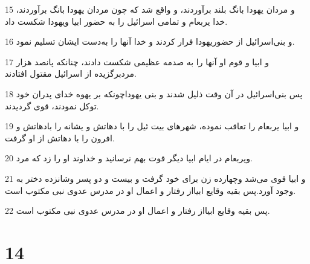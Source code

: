 \par 15 و مردان یهودا بانگ بلند برآوردند، و واقع شد که چون مردان یهودا بانگ برآوردند، خدا یربعام و تمامی اسرائیل را به حضور ابیا ویهودا شکست داد.
\par 16 و بنی‌اسرائیل از حضوریهودا فرار کردند و خدا آنها را به‌دست ایشان تسلیم نمود.
\par 17 و ابیا و قوم او آنها را به صدمه عظیمی شکست دادند، چنانکه پانصد هزار مردبرگزیده از اسرائیل مقتول افتادند.
\par 18 پس بنی‌اسرائیل در آن وقت ذلیل شدند و بنی یهوداچونکه بر یهوه خدای پدران خود توکل نمودند، قوی گردیدند.
\par 19 و ابیا یربعام را تعاقب نموده، شهرهای بیت ئیل را با دهاتش و یشانه را بادهاتش و افرون را با دهاتش از او گرفت.
\par 20 ویربعام در ایام ابیا دیگر قوت بهم نرسانید و خداوند او را زد که مرد.
\par 21 و ابیا قوی می‌شد وچهارده زن برای خود گرفت و بیست و دو پسر وشانزده دختر به وجود آورد.پس بقیه وقایع ابیااز رفتار و اعمال او در مدرس عدوی نبی مکتوب است.
\par 22 پس بقیه وقایع ابیااز رفتار و اعمال او در مدرس عدوی نبی مکتوب است.
 
\chapter{14}

